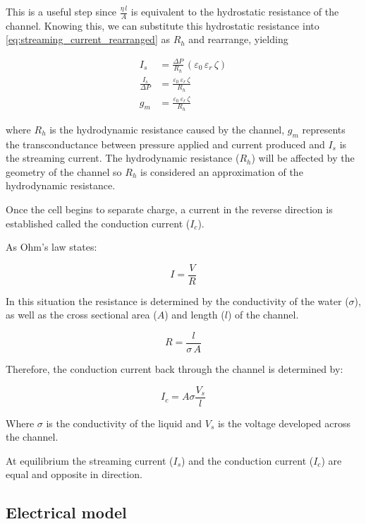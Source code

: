 This is a useful step since $\frac{\eta\,l}{A}$ is equivalent to the hydrostatic resistance of the channel.
Knowing this, we can substitute this hydrostatic resistance into \cref{eq:streaming_current_rearranged} as $R_{h}$ and rearrange, yielding

\begin{align}
    I_{s} & = \frac{\Delta P}{R_{h}}\,\left(\varepsilon_{0}\,\varepsilon_{r}\,\zeta\right)\nonumber\\
    \frac{I_{s}}{\Delta P} & =\frac{\varepsilon_{0}\,\varepsilon_{r}\,\zeta}{R_{h}}\nonumber \\
    g_{m} & = \frac{\varepsilon_{0}\,\varepsilon_{r}\,\zeta}{R_{h}}
\end{align}

where $R_{h}$ is the hydrodynamic resistance caused by the channel, $g_{m}$ represents the transconductance between pressure applied and current produced and $I_{s}$ is the streaming current.
The hydrodynamic resistance ($R_{h}$) will be affected by the geometry of the channel so $R_{h}$ is considered an approximation of the hydrodynamic resistance.

Once the cell begins to separate charge, a current in the reverse direction is established called the conduction current ($I_{c}$).

As Ohm's law states:

\[ I=\frac{V}{R} \]

In this situation the resistance is determined by the conductivity of the water
($\sigma$), as well as the cross sectional area ($A$) and length ($l$) of the
channel.

\[ R=\frac{l}{\sigma\, A} \]


Therefore, the conduction current back through the channel is determined by:

\begin{equation} I_{c}=A\sigma\frac{V_{s}}{l} \end{equation}


Where $\sigma$ is the conductivity of the liquid and $V_{s}$ is the voltage
developed across the channel.

At equilibrium the streaming current ($I_{s}$) and the conduction current
($I_{c}$) are equal and opposite in direction.


\subsection{\label{sub:Electrical-model}Electrical model}

